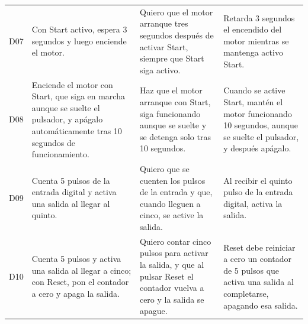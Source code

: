 \documentclass[a4paper,fleqn]{cas-dc}
\begin{document}
\begin{table}[!ht]
\begin{tabularx}{\textwidth}{@{}l >{\raggedright\arraybackslash}X >{\raggedright\arraybackslash}X >{\raggedright\arraybackslash}X@{}}
\addlinespace[2pt]
D07 & Con Start activo, espera 3 segundos y luego enciende el motor. & Quiero que el motor arranque tres segundos después de activar Start, siempre que Start siga activo. & Retarda 3 segundos el encendido del motor mientras se mantenga activo Start.\\
\addlinespace[2pt]
D08 & Enciende el motor con Start, que siga en marcha aunque se suelte el pulsador, y apágalo automáticamente tras 10 segundos de funcionamiento. & Haz que el motor arranque con Start, siga funcionando aunque se suelte y se detenga solo tras 10 segundos. & Cuando se active Start, mantén el motor funcionando 10 segundos, aunque se suelte el pulsador, y después apágalo.\\
\addlinespace[2pt]
D09 & Cuenta 5 pulsos de la entrada digital y activa una salida al llegar al quinto. & Quiero que se cuenten los pulsos de la entrada y que, cuando lleguen a cinco, se active la salida. & Al recibir el quinto pulso de la entrada digital, activa la salida.\\
\addlinespace[2pt]
D10 & Cuenta 5 pulsos y activa una salida al llegar a cinco; con Reset, pon el contador a cero y apaga la salida. & Quiero contar cinco pulsos para activar la salida, y que al pulsar Reset el contador vuelva a cero y la salida se apague. & Reset debe reiniciar a cero un contador de 5 pulsos que activa una salida al completarse, apagando esa salida.\\
\bottomrule
\end{tabularx}
\end{table}
\clearpage
\end{document}
